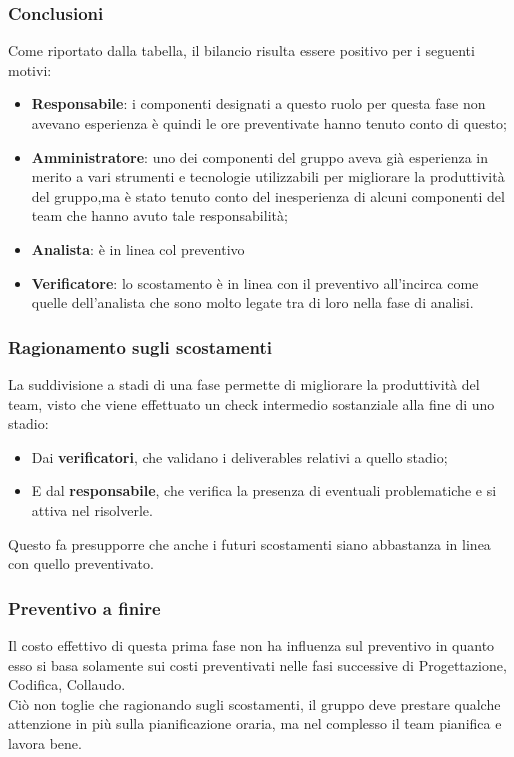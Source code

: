 \subsubsection{Conclusioni}
Come riportato dalla tabella, il bilancio risulta essere positivo per i seguenti motivi:
\begin{itemize}
	\item \textbf{Responsabile}: {i componenti designati a questo ruolo per questa fase non avevano esperienza è quindi le ore preventivate hanno tenuto conto di questo; }
	\item \textbf{Amministratore}: {uno dei componenti del gruppo aveva già esperienza in merito a vari strumenti e tecnologie utilizzabili per migliorare la produttività del gruppo,ma è stato tenuto 
	conto del inesperienza di alcuni componenti del team che hanno avuto tale responsabilità;}
	\item \textbf{Analista}: {è in linea col preventivo}
	\item \textbf{Verificatore}: {lo scostamento è in linea con il preventivo all'incirca come quelle dell'analista che sono molto legate tra di loro nella fase di analisi.}
\end{itemize}

\subsubsection{Ragionamento sugli scostamenti}
La suddivisione a stadi di una fase permette di migliorare la produttività del team, visto che viene effettuato un check intermedio sostanziale alla fine di uno stadio:
\begin{itemize}
	\item Dai \textbf{verificatori}, che validano i deliverables relativi a quello stadio;
	\item E dal \textbf{responsabile}, che verifica la presenza di eventuali problematiche e si attiva nel risolverle.
\end{itemize}
Questo fa presupporre che anche i futuri scostamenti siano abbastanza in linea con quello preventivato.
\subsubsection{Preventivo a finire}
Il costo effettivo di questa prima fase non ha influenza sul preventivo in quanto esso si basa solamente sui costi preventivati nelle fasi successive di Progettazione, Codifica, Collaudo.\\
Ciò non toglie che ragionando sugli scostamenti, il gruppo deve prestare qualche attenzione in più sulla pianificazione oraria, ma nel complesso il team pianifica e lavora bene.
